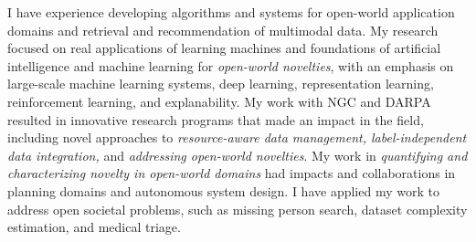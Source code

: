 \documentclass[11pt]{article}
\begin{document}
I have experience developing algorithms and systems for open-world application domains and retrieval and recommendation of multimodal data. 
My research focused on real applications of learning machines and foundations of artificial intelligence and machine learning for \textit{open-world novelties}, with an emphasis on large-scale machine learning systems, deep learning, representation learning, reinforcement learning, and explanability.
My work with NGC and DARPA resulted in innovative research programs that made an impact in the field, including novel approaches to \textit{resource-aware data management, label-independent data integration,} and \textit{addressing open-world novelties}.
My work in \textit{quantifying and characterizing novelty in open-world domains} had impacts and collaborations in planning domains and autonomous system design.
% 
I have applied my work to address open societal problems, such as missing person search, dataset complexity estimation, and medical triage.
\end{document}
